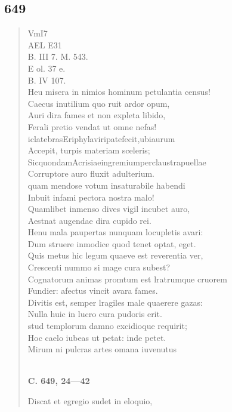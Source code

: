 \documentclass[11pt, a4paper]{report}
\begin{document}
            \subsection*{649}
      \begin{verse}
      VmI7 \\ AEL E31 \\ B. III 7. M. 543. \\ E ol. 37 e. \\ B. IV 107. \\ Heu misera in nimios hominum petulantia census! \\ Caecus inutilium quo ruit ardor opum, \\ Auri dira fames et non expleta libido, \\ Ferali pretio vendat ut omne nefas! \\ iclatebrasEriphylaviripatefecit,ubiaurum \\ Accepit, turpis materiam sceleris; \\ SicquondamAcrisiaeingremiumperclaustrapuellae \\ Corruptore auro fluxit adulterium. \\ quam mendose votum insaturabile habendi \\ Inbuit infami pectora nostra malo! \\ Quamlibet inmenso dives vigil incubet auro, \\ Aestnat augendae dira cupido rei. \\ Henu mala paupertas nunquam locupletis avari: \\ Dum struere inmodice quod tenet optat, eget. \\ Quis metus hic legum quaeve est reverentia ver, \\ Crescenti nummo si mage cura subest? \\ Cognatorum animas promtum est lratrumque cruorem \\ Fundier: afectus vincit avara fames. \\ Divitis est, semper lragiles male quaerere gazas: \\ Nulla huic in lucro cura pudoris erit. \\ stud templorum damno excidioque requirit; \\ Hoc caelo iubeas ut petat: inde petet. \\ Mirum ni pulcras artes omana iuvenutus \\ 
        ﻿\pagebreak 
     \marginpar{[118]} \begin{center} \textbf{C. 649, 24—42} \end{center}Discat et egregio sudet in eloquio, \\ 
      \end{verse}
  
\end{document}
